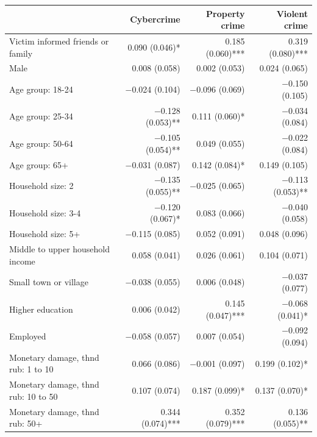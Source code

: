 \begingroup\centering
\begin{tabular}{lrrr}
	\addlinespace[5pt] 
	& Cybercrime & Property crime & Violent crime \\  
	\midrule
Victim informed friends or family & \num{0.090} (\num{0.046})* & \num{0.185} (\num{0.060})*** & \num{0.319} (\num{0.080})*** \\
Male & \num{0.008} (\num{0.058}) & \num{0.002} (\num{0.053}) & \num{0.024} (\num{0.065}) \\
Age group: 18-24 & \num{-0.024} (\num{0.104}) & \num{-0.096} (\num{0.069}) & \num{-0.150} (\num{0.105}) \\
Age group: 25-34 & \num{-0.128} (\num{0.053})** & \num{0.111} (\num{0.060})* & \num{-0.034} (\num{0.084}) \\
Age group: 50-64 & \num{-0.105} (\num{0.054})** & \num{0.049} (\num{0.055}) & \num{-0.022} (\num{0.084}) \\
Age group:   65+ & \num{-0.031} (\num{0.087}) & \num{0.142} (\num{0.084})* & \num{0.149} (\num{0.105}) \\
Household size:   2 & \num{-0.135} (\num{0.055})** & \num{-0.025} (\num{0.065}) & \num{-0.113} (\num{0.053})** \\
Household size: 3-4 & \num{-0.120} (\num{0.067})* & \num{0.083} (\num{0.066}) & \num{-0.040} (\num{0.058}) \\
Household size:  5+ & \num{-0.115} (\num{0.085}) & \num{0.052} (\num{0.091}) & \num{0.048} (\num{0.096}) \\
Middle to upper household income & \num{0.058} (\num{0.041}) & \num{0.026} (\num{0.061}) & \num{0.104} (\num{0.071}) \\
Small town or village & \num{-0.038} (\num{0.055}) & \num{0.006} (\num{0.048}) & \num{-0.037} (\num{0.077}) \\
Higher education & \num{0.006} (\num{0.042}) & \num{0.145} (\num{0.047})*** & \num{-0.068} (\num{0.041})* \\
Employed & \num{-0.058} (\num{0.057}) & \num{0.007} (\num{0.054}) & \num{-0.092} (\num{0.094}) \\
Monetary damage, thnd rub:  1 to 10 & \num{0.066} (\num{0.086}) & \num{-0.001} (\num{0.097}) & \num{0.199} (\num{0.102})* \\
Monetary damage, thnd rub: 10 to 50 & \num{0.107} (\num{0.074}) & \num{0.187} (\num{0.099})* & \num{0.137} (\num{0.070})* \\
Monetary damage, thnd rub:      50+ & \num{0.344} (\num{0.074})*** & \num{0.352} (\num{0.079})*** & \num{0.136} (\num{0.055})** \\

\end{tabular}
